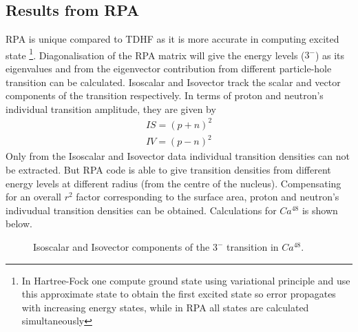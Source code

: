 \documentclass[a4paper]{paper}
\begin{document}
            \subsection{Results from RPA}
                RPA is unique compared to TDHF as it is more accurate in computing excited state  \footnote{In Hartree-Fock one compute ground state using variational principle and use this approximate state to obtain the first excited state so error propagates with increasing energy states, while in RPA all states are calculated simultaneously}. Diagonalisation of the RPA matrix will give the energy levels ($3^{-}$) as its eigenvalues and from the eigenvector contribution from different particle-hole transition can be calculated. 
                Isoscalar and Isovector track the scalar and vector components of the transition respectively. In terms of proton and neutron's individual transition amplitude, they are given by
                \begin{subequations}
                    \begin{eqnarray}
                        IS = (p + n)^2 \\
                        IV = (p - n)^2
                    \end{eqnarray}
                \end{subequations}
                Only from the Isoscalar and Isovector data individual transition densities can not be extracted. But RPA code is able to give transition densities from different energy levels at different radius (from the centre of the nucleus). Compensating for an overall $r^2$ factor corresponding to the surface area, proton and neutron's indivudual transition densities can be obtained. Calculations for $Ca^{48}$ is shown below.
                \begin{figure}[h]
                    \centering
                        \qquad
                        \caption{Isoscalar and Isovector components of the $3^-$ transition in $Ca^{48}$.}
                        \label{fig:rpaisiv}
                \end{figure}
\end{document}
